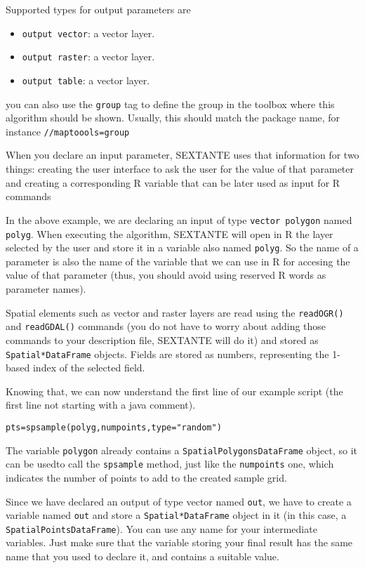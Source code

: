 Supported types for output parameters are

\begin{itemize}
	\item \texttt{output vector}: a vector layer.
	\item \texttt{output raster}: a vector layer.
	\item \texttt{output table}: a vector layer.
\end{itemize}

you can also use the \texttt{group} tag to define the group in the toolbox where this algorithm should be shown. Usually, this should match the package name, for instance \texttt{//maptoools=group}

When you declare an input parameter, SEXTANTE uses that information for two things: creating the user interface to ask the user for the value of that parameter and creating a corresponding R variable that can be later used as input for R commands

In the above example, we are declaring an input of type \texttt{vector polygon} named \texttt{polyg}. When executing the algorithm, SEXTANTE will open in R the layer selected by the user and store it in a variable also named \texttt{polyg}. So the name of a parameter is also the name of the variable that we can use in R for accesing the value of that parameter (thus, you should avoid using reserved R words as parameter names).

Spatial elements such as vector and raster layers are read using the \texttt{readOGR()} and \texttt{readGDAL()} commands (you do not have to worry about adding those commands to your description file, SEXTANTE will do it) and stored as \texttt{Spatial*DataFrame} objects. Fields are stored as numbers, representing the 1-based index of the selected field.

Knowing that, we can now understand the first line of our example script (the first line not starting with a java comment).


\begin{verbatim}
pts=spsample(polyg,numpoints,type="random")
\end{verbatim}

The variable \texttt{polygon} already contains a \texttt{SpatialPolygonsDataFrame} object, so it can be usedto call the \texttt{spsample} method, just like the \texttt{numpoints} one, which indicates the number of points to add to the created sample grid.

Since we have declared an output of type vector named \texttt{out}, we have to create a variable named \texttt{out} and store a \texttt{Spatial*DataFrame} object in it (in this case, a \texttt{SpatialPointsDataFrame}). You can use any name for your intermediate variables. Just make sure that the variable storing your final result has the same name that you used to declare it, and contains a suitable value.


